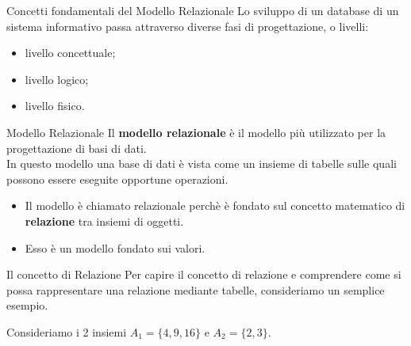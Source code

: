 \begin{frame}{Concetti fondamentali del Modello Relazionale}
Lo sviluppo di un database di un sistema informativo passa attraverso diverse fasi di progettazione, o livelli:
\begin{itemize}[<+->]
    \item livello concettuale;
    \item livello logico;
    \item livello fisico.
\end{itemize}
\pause
\begin{block}{Modello Relazionale}
Il \textbf{modello relazionale} \`e il modello pi\`u utilizzato per la progettazione di basi di dati.
\pause
\newline
\\ In questo modello una base di dati \`e vista come un insieme di tabelle sulle quali possono essere eseguite opportune operazioni.
\pause
\begin{itemize}[<+->]
    \item Il modello \`e chiamato relazionale perch\`e \`e fondato sul concetto matematico di \textbf{relazione} tra insiemi di oggetti.
    \item Esso \`e un modello fondato sui valori.
\end{itemize}
\end{block}
\end{frame}
%
\begin{frame}{Il concetto di Relazione}
Per capire il concetto di relazione e comprendere come si possa rappresentare una relazione mediante tabelle, consideriamo un semplice esempio.

\pause
Consideriamo i 2 insiemi $A_1 = \{4, 9, 16\}$ e $A_2 = \{2, 3\}$.
\pause
\begin{center}
\end{center}
\end{frame}
%
